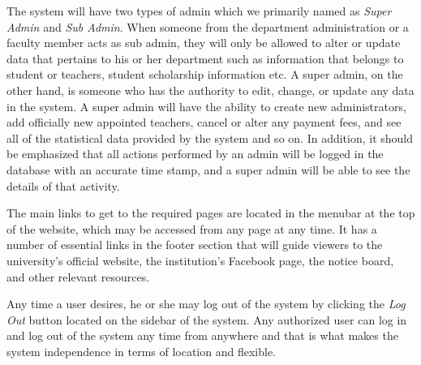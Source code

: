 The system will have two types of admin which we primarily named as \textit{Super Admin} and \textit{Sub Admin}. When someone from the department administration or a faculty member acts as sub admin, they will only be allowed to alter or update data that pertains to his or her department such as information that belongs to student or teachers, student scholarship information etc. A super admin, on the other hand, is someone who has the authority to edit, change, or update any data in the system. A super admin will have the ability to create new administrators, add officially new appointed teachers, cancel or alter any payment fees, and see all of the statistical data provided by the system and so on. In addition, it should be emphasized that all actions performed by an admin will be logged in the database with an accurate time stamp, and a super admin will be able to see the details of that activity.

The main links to get to the required pages are located in the menubar at the top of the website, which may be accessed from any page at any time. It has a number of essential links in the footer section that will guide viewers to the university's official website, the institution's Facebook page, the notice board, and other relevant resources. 

Any time a user desires, he or she may log out of the system by clicking the \textit{Log Out} button located on the sidebar of the system. Any authorized user can log in and log out of the system any time from anywhere and that is what makes the system independence in terms of location and flexible.

\clearpage